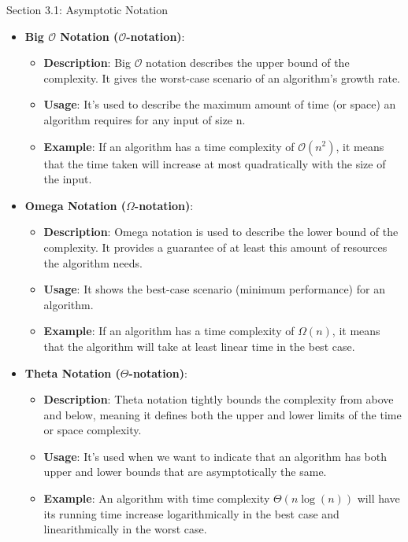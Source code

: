 \begin{notes}{Section 3.1: Asymptotic Notation}
    \begin{itemize}
        \item \textbf{Big $\mathcal{O}$ Notation ($\mathcal{O}$-notation)}:
        \begin{itemize}
            \item \textbf{Description}: Big $\mathcal{O}$ notation describes the upper bound of the complexity. It gives the worst-case scenario of an algorithm's growth rate.
            \item \textbf{Usage}: It's used to describe the maximum amount of time (or space) an algorithm requires for any input of size n.
            \item \textbf{Example}: If an algorithm has a time complexity of $\mathcal{O}(n^{2})$, it means that the time taken will increase at most quadratically with the size of the input.
        \end{itemize}
        \item \textbf{Omega Notation ($\Omega$-notation)}:
        \begin{itemize}
            \item \textbf{Description}: Omega notation is used to describe the lower bound of the complexity. It provides a guarantee of at least this amount of resources the algorithm needs.
            \item \textbf{Usage}: It shows the best-case scenario (minimum performance) for an algorithm.
            \item \textbf{Example}: If an algorithm has a time complexity of $\Omega(n)$, it means that the algorithm will take at least linear time in the best case.
        \end{itemize}
        \item \textbf{Theta Notation ($\Theta$-notation)}:
        \begin{itemize}
            \item \textbf{Description}: Theta notation tightly bounds the complexity from above and below, meaning it defines both the upper and lower limits of the time or space complexity.
            \item \textbf{Usage}: It's used when we want to indicate that an algorithm has both upper and lower bounds that are asymptotically the same.
            \item \textbf{Example}: An algorithm with time complexity $\Theta(n \log{(n)})$ will have its running time increase logarithmically in the best case and linearithmically in the worst case.
        \end{itemize}
    \end{itemize}


\end{notes}
